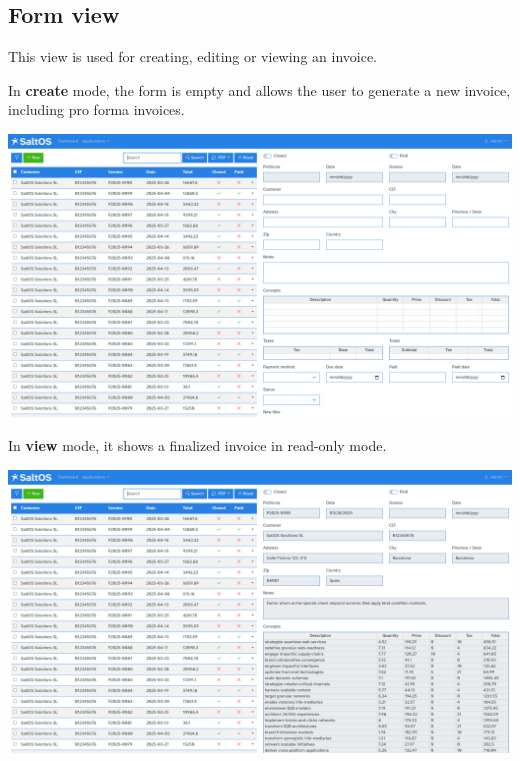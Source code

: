 \documentclass[a4paper]{article}
\begin{document}
\hypertarget{toc139}{}
\subsection{Form view}

This view is used for creating, editing or viewing an invoice.

In \textbf{create} mode, the form is empty and allows the user to generate a new invoice, including pro forma invoices.

\begin{center}\includegraphics[width=1\textwidth]{../ujest/snaps/test-screenshots-js-screenshots-sales-invoices-create-en-us-1-snap.png}\end{center}

In \textbf{view} mode, it shows a finalized invoice in read-only mode.

\begin{center}\includegraphics[width=1\textwidth]{../ujest/snaps/test-screenshots-js-screenshots-sales-invoices-view-100-en-us-1-snap.png}\end{center}
\end{document}
